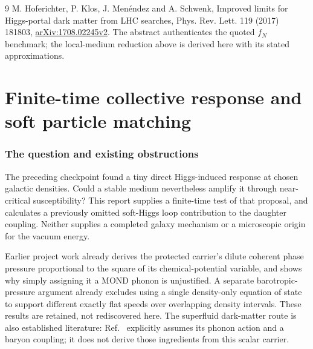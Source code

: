 \documentclass[11pt]{article}
\begin{document}
\begin{thebibliography}{9}
 M. Hoferichter, P. Klos, J. Men\'endez and
A. Schwenk, Improved limits for Higgs-portal dark matter from LHC searches,
Phys. Rev. Lett. 119 (2017) 181803,
\href{https://arxiv.org/abs/1708.02245v2}{arXiv:1708.02245v2}.
The abstract authenticates the quoted $f_N$ benchmark; the local-medium
reduction above is derived here with its stated approximations.
\end{thebibliography}

\clearpage

\part{Finite-time collective response and soft particle matching}

\section{The question and existing obstructions}
The preceding checkpoint found a tiny direct Higgs-induced response at
chosen galactic densities. Could a stable medium nevertheless amplify it
through near-critical susceptibility? This report supplies a finite-time
test of that proposal, and calculates a previously omitted soft-Higgs loop
contribution to the daughter coupling. Neither supplies a completed galaxy
mechanism or a microscopic origin for the vacuum energy.

Earlier project work already derives the protected carrier's dilute coherent
phase pressure proportional to the square of its chemical-potential variable,
and shows why simply assigning it a MOND phonon is unjustified. A separate
barotropic-pressure argument already excludes using a single density-only
equation of state to support different exactly flat speeds over overlapping
density intervals. These results are retained, not rediscovered here.
The superfluid dark-matter route is also established literature:
Ref.~\cite{pr:superfluid} explicitly assumes its phonon action and a baryon
coupling; it does not derive those ingredients from this scalar carrier.
\end{document}
